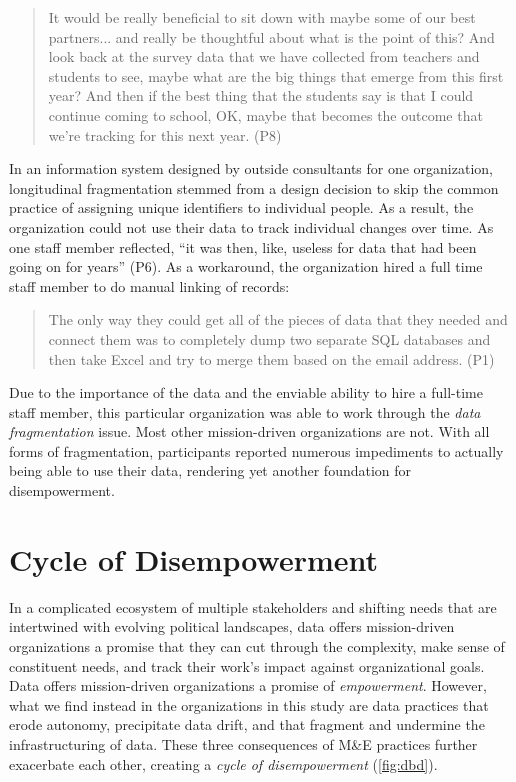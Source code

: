 \begin{quote}\singlespacing It would be really beneficial to sit down with maybe some of our best partners... and really be thoughtful about what is the point of this? And look back at the survey data that we have collected from teachers and students to see, maybe what are the big things that emerge from this first year? And then if the best thing that the students say is that I could continue coming to school, OK, maybe that becomes the outcome that we’re tracking for this next year. (P8)\end{quote}

In an information system designed by outside consultants for one organization, longitudinal fragmentation stemmed from a design decision to skip the common practice of assigning unique identifiers to individual people. As a result, the organization could not use their data to track individual changes over time. As one staff member reflected, “it was then, like, useless for data that had been going on for years” (P6). As a workaround, the organization hired a full time staff member to do manual linking of records:

\begin{quote}\singlespacing The only way they could get all of the pieces of data that they needed and connect them was to completely dump two separate SQL databases and then take Excel and try to merge them based on the email address. (P1)\end{quote}

Due to the importance of the data and the enviable ability to hire a full-time staff member, this particular organization was able to work through the \textit{data fragmentation} issue. Most other mission-driven organizations are not. With all forms of fragmentation, participants reported numerous impediments to actually being able to use their data, rendering yet another foundation for disempowerment.

\section{Cycle of Disempowerment}
In a complicated ecosystem of multiple stakeholders and shifting needs that are intertwined with evolving political landscapes, data offers mission-driven organizations a promise that they can cut through the complexity, make sense of constituent needs, and track their work’s impact against organizational goals. Data offers mission-driven organizations a promise of \textit{empowerment}. However, what we find instead in the organizations in this study are data practices that erode autonomy, precipitate data drift, and that fragment and undermine the infrastructuring of data. These three consequences of M\&E practices further exacerbate each other, creating a \textit{cycle of disempowerment} (\autoref{fig:dbd}).

